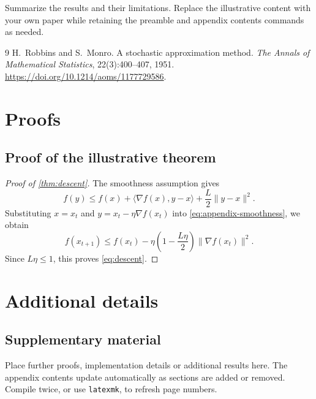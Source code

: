 \documentclass[10pt,a4paper]{article}
\theoremstyle{definition}
\theoremstyle{remark}
\begin{document}
Summarize the results and their limitations. Replace the illustrative
content with your own paper while retaining the preamble and appendix
contents commands as needed.

\clearpage
\begin{thebibliography}{9}
H.~Robbins and S.~Monro.
\newblock A stochastic approximation method.
\newblock \emph{The Annals of Mathematical Statistics},
22(3):400--407, 1951.
\newblock \url{https://doi.org/10.1214/aoms/1177729586}.
\end{thebibliography}

% 
% 

\clearpage
\appendix
{}
\begingroup
\color{CrossReferenceRed}
\hypersetup{linktoc=all}
\renewcommand{\contentsname}{Contents of the Appendices}
{}
\tableofcontents
\endgroup
\clearpage
{}

\section{Proofs}
\label{app:proofs}

\subsection{Proof of the illustrative theorem}

\begin{proof}[Proof of \cref{thm:descent}]
The smoothness assumption gives
\begin{equation}
 f(y)\le f(x)+\langle\nabla f(x),y-x\rangle
             +\frac{L}{2}\|y-x\|^2.
 \label{eq:appendix-smoothness}
\end{equation}
Substituting $x=x_t$ and $y=x_t-\eta\nabla f(x_t)$ into
\eqref{eq:appendix-smoothness}, we obtain
\[
 f(x_{t+1})\le f(x_t)
 -\eta\left(1-\frac{L\eta}{2}\right)\|\nabla f(x_t)\|^2.
\]
Since $L\eta\le1$, this proves \eqref{eq:descent}.
\end{proof}

\section{Additional details}

\subsection{Supplementary material}

Place further proofs, implementation details or additional results here.
The appendix contents update automatically as sections are added or
removed. Compile twice, or use \texttt{latexmk}, to refresh page numbers.
\end{document}

